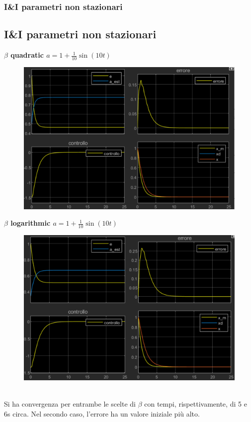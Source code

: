 \documentclass{beamer}
\begin{document}
\begin{frame}
	\frametitle{I\&I parametri non stazionari}
	\subsection{I\&I parametri non stazionari}
	\begin{minipage}[t]{0.45\textwidth}
		\textbf{\(\beta \) quadratic \( a=1+\frac{1}{10}\sin{(10t)}\)}
		\begin{figure}
			\includegraphics[scale=0.35]{2022-05-21-10-38-05.png} %
		\end{figure}
	\end{minipage}
	\begin{minipage}[t]{0.45\textwidth}
		\textbf{\(\beta \) logarithmic \( a=1+\frac{1}{10}\sin{(10t)}\)}
		\begin{figure}
			\includegraphics[scale=0.35]{2022-05-21-10-39-00.png} %
		\end{figure}
	\end{minipage}
	\vspace{0.1cm}\\
	Si ha convergenza per entrambe le scelte di \(\beta \) con tempi, rispettivamente, di 5 e 6s circa. Nel secondo caso, l'errore ha un valore iniziale più alto.
\end{frame}
\end{document}
